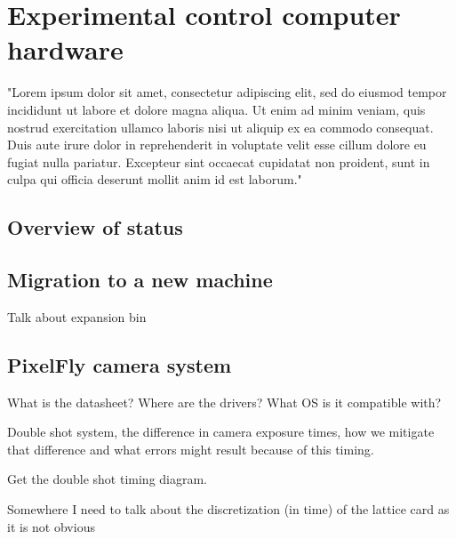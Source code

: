 \chapter{Experimental control computer hardware}
"Lorem ipsum dolor sit amet, consectetur adipiscing elit, sed do eiusmod tempor incididunt ut labore et dolore magna aliqua. Ut enim ad minim veniam, quis nostrud exercitation ullamco laboris nisi ut aliquip ex ea commodo consequat. Duis aute irure dolor in reprehenderit in voluptate velit esse cillum dolore eu fugiat nulla pariatur. Excepteur sint occaecat cupidatat non proident, sunt in culpa qui officia deserunt mollit anim id est laborum."

\section{Overview of status}

\section{Migration to a new machine}
Talk about expansion bin

\section{PixelFly camera system}

What is the datasheet?
Where are the drivers?
What OS is it compatible with?

Double shot system, the difference in camera exposure times, how we mitigate that difference and what errors might result because of this timing.

Get the double shot timing diagram.

Somewhere I need to talk about the discretization (in time) of the lattice card as it is not obvious